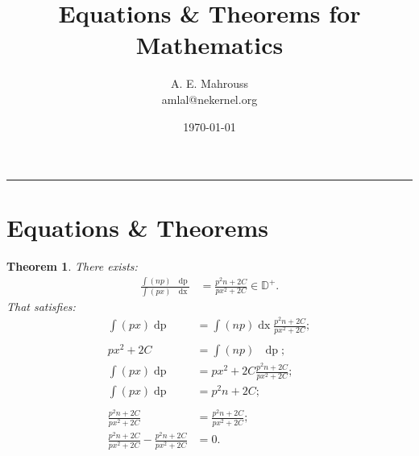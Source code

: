 \documentclass[10pt]{article}
\title{Equations \& Theorems for Mathematics}
\author{A. E. Mahrouss\\amlal@nekernel.org}
\date{\today}
\theoremstyle{plain}
\newtheorem{theorem}{Theorem}[section]
\theoremstyle{definition}
\theoremstyle{remark}
\begin{document}
\maketitle
\vspace{-0.5em}
\vspace{0.8em}
\rule{\linewidth}{0.4pt}
\vspace{1em}

\section{Equations \& Theorems}
\begin{theorem}
    There exists:
    \begin{align*}
        \frac{\int (np) \text{ } \operatorname{dp}}{\int (px) \text{ } \operatorname{dx}} &= \frac{p^2n+2C}{px^2+2C} \in \mathbb{D}^{+}.
    \end{align*}
    That satisfies:
    \begin{align*}
        \int (px) \operatorname{dp} &= \int (np) \operatorname{dx} \frac{p^2n+2C}{px^2+2C};\\\\
        px^2+2C &= \int (np) \text{ } \operatorname{dp};\\
        \int (px) \operatorname{dp} &= px^2+2C \frac{p^2n+2C}{px^2+2C};\\
        \int (px) \operatorname{dp} &= p^2n+2C;\\\\
        \frac{p^2n+2C}{px^2+2C} &= \frac{p^2n+2C}{px^2+2C};\\
        \frac{p^2n+2C}{px^2+2C} - \frac{p^2n+2C}{px^2+2C} &= 0.
    \end{align*}
\end{theorem}

\nocite{*}



\end{document}
